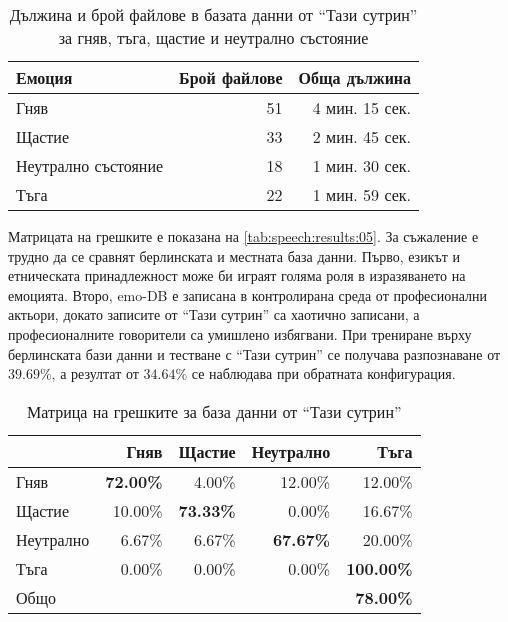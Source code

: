 \documentclass[main.tex]{subfiles}
\begin{document}
\begin{table}[ht]
    \begin{center}
    \begin{tabular}{|l|r|r|} 
        \hline
        Емоция & Брой файлове & Обща дължина\\ 
        \hline
        Гняв & 51 & 4 мин. 15 сек.\\ 
        Щастие &  33 & 2 мин. 45 сек.\\ 
        Неутрално състояние &  18 & 1 мин. 30 сек.\\ 
        Тъга &  22 & 1 мин. 59 сек.\\ 
        \hline
    \end{tabular}
    \caption{Дължина и брой файлове в базата данни от ``Тази сутрин'' за гняв, тъга, щастие и неутрално състояние}
    \label{tab:speech:results:04}
    \end{center}
\end{table}
Матрицата на грешките е показана на \autoref{tab:speech:results:05}.
За съжаление е трудно да се сравнят берлинската и местната база данни. Първо, езикът и етническата принадлежност може би играят голяма роля в изразяването на емоцията. Второ, emo-DB е записана в контролирана среда от професионални актьори, докато записите от ``Тази сутрин'' са хаотично записани, а професионалните говорители са умишлено избягвани. При трениране върху берлинската бази данни и тестване с ``Тази сутрин'' се получава разпознаване от $39.69\%$, а резултат от $34.64\%$ се наблюдава при обратната конфигурация.
\begin{table}[h]
    \begin{center}
    \begin{tabular}{|l|r r r r|} 
        \hline
        & Гняв & Щастие & Неутрално & Тъга\\ 
        \hline
        Гняв &  \textbf{72.00\%} & 4.00\% & 12.00\% & 12.00\%\\ 
        Щастие & 10.00\% & \textbf{73.33\%} & 0.00\% & 16.67\% \\ 
        Неутрално & 6.67\% & 6.67\% & \textbf{67.67\%} & 20.00\% \\ 
        Тъга & 0.00\% & 0.00\% & 0.00\% & \textbf{100.00\%}\\ 
        \hline
        \hline
        Общо & & & & \textbf{78.00\%}\\
        \hline
    \end{tabular}
    \caption{Матрица на грешките за база данни от ``Тази сутрин''}
    \label{tab:speech:results:05}
    \end{center}
\end{table}
\end{document}

